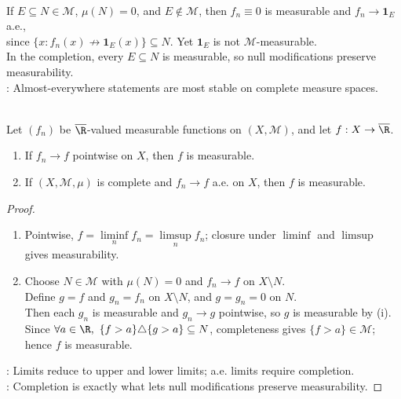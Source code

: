 \begin{remark} \label{rem:completion-needed-for-ae-limits} \\
If $E\subseteq N\in\mathcal{M}$, $\mu(N)=0$, and $E\notin\mathcal{M}$, then $f_n\equiv0$ is measurable and $f_n\to\mathbf{1}_E$ a.e.,\\
since $\{x:f_n(x)\not\to\mathbf{1}_E(x)\}\subseteq N$. Yet $\mathbf{1}_E$ is not $\mathcal{M}$-measurable.\\
In the completion, every $E\subseteq N$ is measurable, so null modifications preserve measurability.\\
: Almost-everywhere statements are most stable on complete measure spaces.
\end{remark}

\begin{corollary} \label{cor:pointwise-ae-limits-measurable} \\
Let $(f_n)$ be $\overline{\R}$-valued measurable functions on $(X,\mathcal{M})$, and let $f:X\to\overline{\R}$.
\begin{enumerate}[label=(\roman*)]
\setlength{\itemsep}{0pt}
\item If $f_n\to f$ pointwise on $X$, then $f$ is measurable.
\item If $(X,\mathcal{M},\mu)$ is complete and $f_n\to f$ a.e. on $X$, then $f$ is measurable.
\end{enumerate}
\begin{proof}
\begin{enumerate}[label=(\roman*)]
\setlength{\itemsep}{0pt}
\item Pointwise, $f=\liminf\limits_nf_n=\limsup\limits_nf_n$; closure under $\liminf$ and $\limsup$ gives measurability.
\item Choose $N\in\mathcal{M}$ with $\mu(N)=0$ and $f_n\to f$ on $X\setminus N$.\\
Define $g=f$ and $g_n=f_n$ on $X\setminus N$, and $g=g_n=0$ on $N$.\\
Then each $g_n$ is measurable and $g_n\to g$ pointwise, so $g$ is measurable by (i).\\
Since $\forall a\in\R,\ \{f>a\}\triangle\{g>a\}\subseteq N$, completeness gives $\{f>a\}\in\mathcal{M}$; hence $f$ is measurable.
\end{enumerate}
: Limits reduce to upper and lower limits; a.e. limits require completion.\\
: Completion is exactly what lets null modifications preserve measurability.
\end{proof}
\end{corollary}

